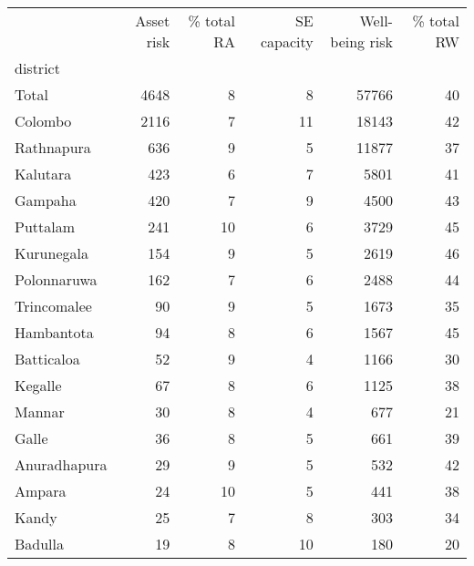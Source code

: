 \begin{tabular}{lrrrrr}
\toprule
{} &  Asset risk &  \% total RA &  SE capacity &  Well-being risk &  \% total RW \\
district     &             &             &              &                  &             \\
\midrule
Total        &        4648 &           8 &            8 &            57766 &          40 \\
Colombo      &        2116 &           7 &           11 &            18143 &          42 \\
Rathnapura   &         636 &           9 &            5 &            11877 &          37 \\
Kalutara     &         423 &           6 &            7 &             5801 &          41 \\
Gampaha      &         420 &           7 &            9 &             4500 &          43 \\
Puttalam     &         241 &          10 &            6 &             3729 &          45 \\
Kurunegala   &         154 &           9 &            5 &             2619 &          46 \\
Polonnaruwa  &         162 &           7 &            6 &             2488 &          44 \\
Trincomalee  &          90 &           9 &            5 &             1673 &          35 \\
Hambantota   &          94 &           8 &            6 &             1567 &          45 \\
Batticaloa   &          52 &           9 &            4 &             1166 &          30 \\
Kegalle      &          67 &           8 &            6 &             1125 &          38 \\
Mannar       &          30 &           8 &            4 &              677 &          21 \\
Galle        &          36 &           8 &            5 &              661 &          39 \\
Anuradhapura &          29 &           9 &            5 &              532 &          42 \\
Ampara       &          24 &          10 &            5 &              441 &          38 \\
Kandy        &          25 &           7 &            8 &              303 &          34 \\
Badulla      &          19 &           8 &           10 &              180 &          20 \\

\end{tabular}
